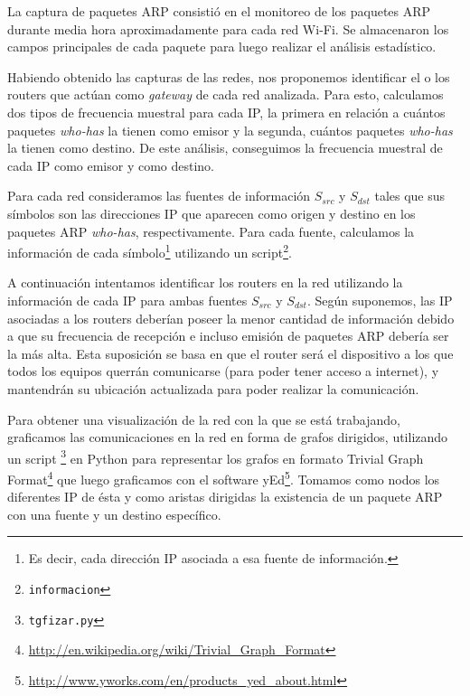 \documentclass[a4paper, 10pt, twoside]{article}
\begin{document}
La captura de paquetes ARP consistió en el monitoreo de los paquetes ARP durante media hora aproximadamente para cada red Wi-Fi. Se almacenaron los campos principales de cada paquete para luego realizar el análisis estadístico.

Habiendo obtenido las capturas de las redes, nos proponemos identificar el o los routers que actúan como \textit{gateway} de cada red analizada. Para esto, calculamos dos tipos de frecuencia muestral para cada IP, la primera en relación a cuántos paquetes \textit{who-has} la tienen como emisor y la segunda, cuántos paquetes \textit{who-has} la tienen como destino. De este análisis, conseguimos la frecuencia muestral de cada IP como emisor y como destino.

Para cada red consideramos las fuentes de información $S_{src}$ y $S_{dst}$ tales que sus símbolos son las direcciones IP que aparecen como origen y destino en los paquetes ARP \textit{who-has}, respectivamente. Para cada fuente, calculamos la información de cada símbolo\footnote{Es decir, cada dirección IP asociada a esa fuente de información.} utilizando un script\footnote{\texttt{informacion}}.

A continuación intentamos identificar los routers en la red utilizando la información de cada IP para ambas fuentes $S_{src}$ y $S_{dst}$. Según suponemos, las IP asociadas a los routers deberían poseer la menor cantidad de información debido a que su frecuencia de recepción e incluso emisión de paquetes ARP debería ser la más alta. Esta suposición se basa en que el router será el dispositivo a los que todos los equipos querrán comunicarse (para poder tener acceso a internet), y mantendrán su ubicación actualizada para poder realizar la comunicación.

Para obtener una visualización de la red con la que se está trabajando, graficamos las comunicaciones en la red en forma de grafos dirigidos, utilizando un script \footnote{\texttt{tgfizar.py}} en Python para representar los grafos en formato Trivial Graph Format\footnote{\url{http://en.wikipedia.org/wiki/Trivial_Graph_Format}} que luego graficamos con el software yEd\footnote{\url{http://www.yworks.com/en/products_yed_about.html}}. Tomamos como nodos los diferentes IP de ésta y como aristas dirigidas la existencia de un paquete ARP con una fuente y un destino específico.


\end{document}
